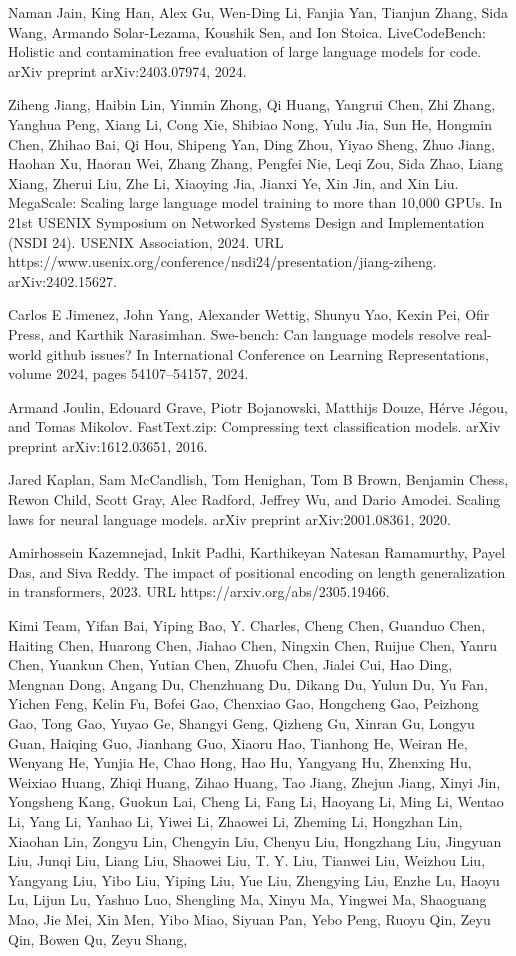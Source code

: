 Naman Jain, King Han, Alex Gu, Wen-Ding Li, Fanjia Yan, Tianjun Zhang,
Sida Wang, Armando Solar-Lezama, Koushik Sen, and Ion Stoica.
LiveCodeBench: Holistic and contamination free evaluation of large
language models for code. arXiv preprint arXiv:2403.07974, 2024.

Ziheng Jiang, Haibin Lin, Yinmin Zhong, Qi Huang, Yangrui Chen, Zhi
Zhang, Yanghua Peng, Xiang Li, Cong Xie, Shibiao Nong, Yulu Jia, Sun He,
Hongmin Chen, Zhihao Bai, Qi Hou, Shipeng Yan, Ding Zhou, Yiyao Sheng,
Zhuo Jiang, Haohan Xu, Haoran Wei, Zhang Zhang, Pengfei Nie, Leqi Zou,
Sida Zhao, Liang Xiang, Zherui Liu, Zhe Li, Xiaoying Jia, Jianxi Ye, Xin
Jin, and Xin Liu. MegaScale: Scaling large language model training to
more than 10,000 GPUs. In 21st USENIX Symposium on Networked Systems
Design and Implementation (NSDI 24). USENIX Association, 2024. URL
https://www.usenix.org/conference/nsdi24/presentation/jiang-ziheng.
arXiv:2402.15627.

Carlos E Jimenez, John Yang, Alexander Wettig, Shunyu Yao, Kexin Pei,
Ofir Press, and Karthik Narasimhan. Swe-bench: Can language models
resolve real-world github issues? In International Conference on
Learning Representations, volume 2024, pages 54107--54157, 2024.

Armand Joulin, Edouard Grave, Piotr Bojanowski, Matthijs Douze, Hérve
Jégou, and Tomas Mikolov. FastText.zip: Compressing text classification
models. arXiv preprint arXiv:1612.03651, 2016.

Jared Kaplan, Sam McCandlish, Tom Henighan, Tom B Brown, Benjamin Chess,
Rewon Child, Scott Gray, Alec Radford, Jeffrey Wu, and Dario Amodei.
Scaling laws for neural language models. arXiv preprint
arXiv:2001.08361, 2020.

Amirhossein Kazemnejad, Inkit Padhi, Karthikeyan Natesan Ramamurthy,
Payel Das, and Siva Reddy. The impact of positional encoding on length
generalization in transformers, 2023. URL https://arxiv.org/abs/2305.19466.

Kimi Team, Yifan Bai, Yiping Bao, Y. Charles, Cheng Chen, Guanduo Chen,
Haiting Chen, Huarong Chen, Jiahao Chen, Ningxin Chen, Ruijue Chen,
Yanru Chen, Yuankun Chen, Yutian Chen, Zhuofu Chen, Jialei Cui, Hao
Ding, Mengnan Dong, Angang Du, Chenzhuang Du, Dikang Du, Yulun Du, Yu
Fan, Yichen Feng, Kelin Fu, Bofei Gao, Chenxiao Gao, Hongcheng Gao,
Peizhong Gao, Tong Gao, Yuyao Ge, Shangyi Geng, Qizheng Gu, Xinran Gu,
Longyu Guan, Haiqing Guo, Jianhang Guo, Xiaoru Hao, Tianhong He, Weiran
He, Wenyang He, Yunjia He, Chao Hong, Hao Hu, Yangyang Hu, Zhenxing Hu,
Weixiao Huang, Zhiqi Huang, Zihao Huang, Tao Jiang, Zhejun Jiang, Xinyi
Jin, Yongsheng Kang, Guokun Lai, Cheng Li, Fang Li, Haoyang Li, Ming Li,
Wentao Li, Yang Li, Yanhao Li, Yiwei Li, Zhaowei Li, Zheming Li,
Hongzhan Lin, Xiaohan Lin, Zongyu Lin, Chengyin Liu, Chenyu Liu,
Hongzhang Liu, Jingyuan Liu, Junqi Liu, Liang Liu, Shaowei Liu, T. Y.
Liu, Tianwei Liu, Weizhou Liu, Yangyang Liu, Yibo Liu, Yiping Liu, Yue
Liu, Zhengying Liu, Enzhe Lu, Haoyu Lu, Lijun Lu, Yashuo Luo, Shengling
Ma, Xinyu Ma, Yingwei Ma, Shaoguang Mao, Jie Mei, Xin Men, Yibo Miao,
Siyuan Pan, Yebo Peng, Ruoyu Qin, Zeyu Qin, Bowen Qu, Zeyu Shang,



